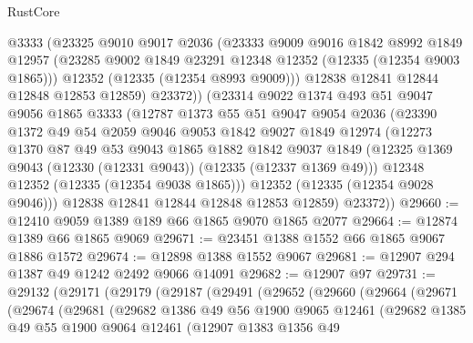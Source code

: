 \begin{lexlean}{RustCore}
\begin{coremodule}
          @3333
          (@23325
            @9010
            @9017
            @2036
            (@23333
              @9009
              @9016
              @1842
              @8992
              @1849
              @12957
              (@23285 @9002 @1849 @23291 @12348 @12352 (@12335 (@12354 @9003 @1865)))
              @12352
              (@12335 (@12354 @8993 @9009)))
            @12838
            @12841
            @12844
            @12848
            @12853
            @12859)
          @23372))
      (@23314
        @9022
        @1374
        @493
        @51
        @9047
        @9056
        @1865
        @3333
        (@12787
          @1373
          @55
          @51
          @9047
          @9054
          @2036
          (@23390
            @1372
            @49
            @54
            @2059
            @9046
            @9053
            @1842
            @9027
            @1849
            @12974
            (@12273
              @1370
              @87
              @49
              @53
              @9043
              @1865
              @1882
              @1842
              @9037
              @1849
              (@12325 @1369 @9043 (@12330 (@12331 @9043)) (@12335 (@12337 @1369 @49)))
              @12348
              @12352
              (@12335 (@12354 @9038 @1865)))
            @12352
            (@12335 (@12354 @9028 @9046)))
          @12838
          @12841
          @12844
          @12848
          @12853
          @12859)
        @23372))
@29660 := @12410 @9059 @1389 @189 @66 @1865 @9070 @1865 @2077
@29664 := @12874 @1389 @66 @1865 @9069
@29671 := @23451 @1388 @1552 @66 @1865 @9067 @1886 @1572
@29674 := @12898 @1388 @1552 @9067
@29681 := @12907 @294 @1387 @49 @1242 @2492 @9066 @14091
@29682 := @12907 @97
@29731 := @29132
    (@29171
      (@29179
        (@29187
          (@29491
            (@29652
              (@29660
                (@29664
                  (@29671
                    (@29674
                      (@29681
                        (@29682
                          @1386
                          @49
                          @56
                          @1900
                          @9065
                          @12461
                          (@29682
                            @1385
                            @49
                            @55
                            @1900
                            @9064
                            @12461
                            (@12907
                              @1383
                              @1356
                              @49

\end{coremodule}
\end{lexlean}
